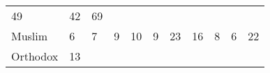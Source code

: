 \documentclass[]{article}
\begin{document}
\begin{longtable}[]{@{}lllllllllll@{}}
\begin{minipage}[t]{0.06\columnwidth}
49\strut
\end{minipage} & \begin{minipage}[t]{0.04\columnwidth}\raggedright\strut
42\strut
\end{minipage} & \begin{minipage}[t]{0.11\columnwidth}\raggedright\strut
69\strut
\end{minipage}\tabularnewline
\begin{minipage}[t]{0.14\columnwidth}\raggedright\strut
Muslim\strut
\end{minipage} & \begin{minipage}[t]{0.04\columnwidth}\raggedright\strut
6\strut
\end{minipage} & \begin{minipage}[t]{0.05\columnwidth}\raggedright\strut
7\strut
\end{minipage} & \begin{minipage}[t]{0.05\columnwidth}\raggedright\strut
9\strut
\end{minipage} & \begin{minipage}[t]{0.05\columnwidth}\raggedright\strut
10\strut
\end{minipage} & \begin{minipage}[t]{0.05\columnwidth}\raggedright\strut
9\strut
\end{minipage} & \begin{minipage}[t]{0.05\columnwidth}\raggedright\strut
23\strut
\end{minipage} & \begin{minipage}[t]{0.06\columnwidth}\raggedright\strut
16\strut
\end{minipage} & \begin{minipage}[t]{0.06\columnwidth}\raggedright\strut
8\strut
\end{minipage} & \begin{minipage}[t]{0.04\columnwidth}\raggedright\strut
6\strut
\end{minipage} & \begin{minipage}[t]{0.11\columnwidth}\raggedright\strut
22\strut
\end{minipage}\tabularnewline
\begin{minipage}[t]{0.14\columnwidth}\raggedright\strut
Orthodox\strut
\end{minipage} & \begin{minipage}[t]{0.04\columnwidth}\raggedright\strut
13\strut
\end{minipage} & \begin{minipage}[t]{0.05\columnwidth}\raggedright\strut

\end{minipage}
\end{longtable}
\end{document}
